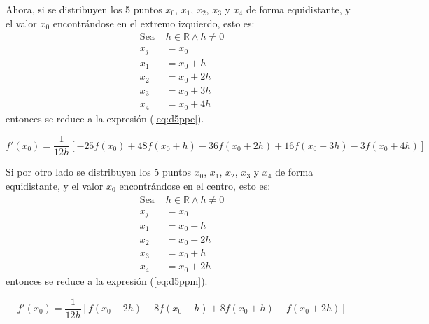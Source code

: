 Ahora, si se distribuyen los 5 puntos $x_0$, $x_1$, $x_2$, $x_3$ y $x_4$ de forma equidistante, y el valor $x_0$ encontrándose
en el extremo izquierdo, esto es:
\begin{align*}
	\mbox{Sea }& h\in\mathbb{R} \wedge h\not=0 \\
	x_j &= x_0\\
	x_1 &= x_0 + h \\ 
	x_2 &= x_0 + 2h \\
	x_3 &= x_0 + 3h \\
	x_4 &= x_0 + 4h
\end{align*}
entonces se reduce a la expresión (\ref{eq:d5ppe}).

\begin{definitionT}
	\begin{equation}
		f'(x_0) = \frac{1}{12h}\left[-25f(x_0) + 48f(x_0+h) - 36f(x_0+2h) + 16f(x_0+3h) - 3f(x_0+4h)\right]
		\label{eq:d5ppe}
	\end{equation}
\end{definitionT}

Si por otro lado se distribuyen los 5 puntos $x_0$, $x_1$, $x_2$, $x_3$ y $x_4$ de forma equidistante, y el valor $x_0$ encontrándose
en el centro, esto es:
\begin{align*}
	\mbox{Sea }& h\in\mathbb{R} \wedge h\not=0 \\
	x_j &= x_0\\
	x_1 &= x_0 - h \\ 
	x_2 &= x_0 - 2h \\
	x_3 &= x_0 + h \\
	x_4 &= x_0 + 2h
\end{align*}
entonces se reduce a la expresión (\ref{eq:d5ppm}).

\begin{definitionT}
	\begin{equation}
		f'(x_0) = \frac{1}{12h}\left[f(x_0-2h) - 8f(x_0-h) + 8f(x_0+h) - f(x_0+2h) \right]
		\label{eq:d5ppm}
	\end{equation}
\end{definitionT}

